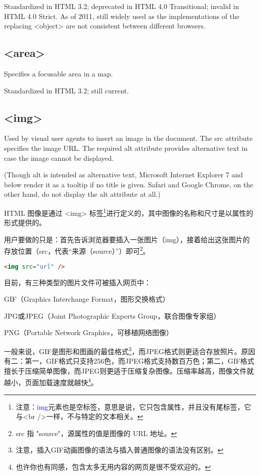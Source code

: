 Standardized in HTML 3.2; deprecated in HTML 4.0 Transitional; invalid in HTML 4.0 Strict. As of 2011, still widely used as the implementations of the replacing <object> are not consistent between different browsers.


\subsection{<area>}

Specifies a focusable area in a map.

Standardized in HTML 3.2; still current.

\subsection{<img>}

Used by visual user agents to insert an image in the document. The src attribute specifies the image URL. The required alt attribute provides alternative text in case the image cannot be displayed.

(Though alt is intended as alternative text, Microsoft Internet Explorer 7 and below render it as a tooltip if no title is given. Safari and Google Chrome, on the other hand, do not display the alt attribute at all.) 



HTML 图像是通过 <img> 标签\footnote{注意：\textcolor{Blue}{img}元素也是空标签，意思是说，它只包含属性，并且没有尾标签，它与<br />一样，不与特定的文本相关。}进行定义的，其中图像的名称和尺寸是以属性的形式提供的。

用户要做的只是：首先告诉浏览器要插入一张图片（img），接着给出这张图片的存放位置（src，代表“来源（source）”）即可\footnote{src 指 "source"，源属性的值是图像的 URL 地址。}。

\begin{lstlisting}[language=HTML]
	<img src="url" />
\end{lstlisting}

目前，有三种类型的图片文件可被插入网页中：

\begin{compactitem}
\item GIF（Graphics Interchange Format，图形交换格式）
\item JPG或JPEG（Joint Photographic Experts Group，联合图像专家组）
\item PNG（Portable Network Graphics，可移植网络图像）
\end{compactitem}

一般来说，GIF是图形和图画的最佳格式\footnote{注意，插入GIF动画图像的语法与插入普通图像的语法没有区别。}，而JPEG格式则更适合存放照片。原因有二：第一，GIF格式只支持256色，而JPEG格式支持数百万色；第二，GIF格式擅长于压缩简单图像，而JPEG则更适于压缩复杂图像。压缩率越高，图像文件就越小，页面加载速度就越快\footnote{也许你也有同感，包含太多无用内容的网页是很不受欢迎的。}。

